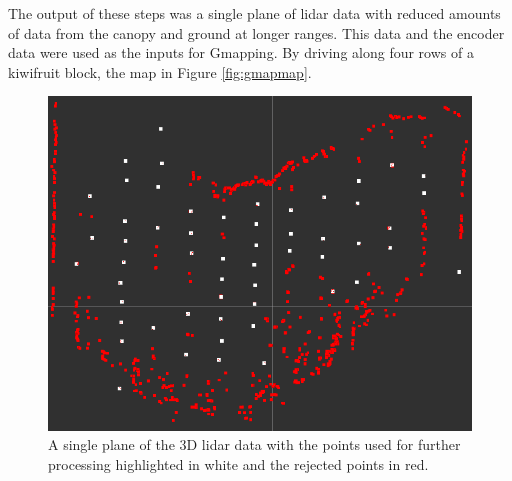 \documentclass[preprint,authoryear,12pt]{elsarticle}
\begin{document}
    The output of these steps was a single plane of lidar data with reduced amounts of data from the canopy and ground at longer ranges. This data and the encoder data were used as the inputs for Gmapping. By driving along four rows of a kiwifruit block, the map in Figure \ref{fig:gmapmap}.

    \begin{figure}[htb]
        \centering
        \includegraphics[width=\linewidth]{imgs/photos/singlePlaneExtraction.png}
        \caption{
            A single plane of the 3D lidar data with the points used for further processing highlighted in white and the rejected points in red.
        }
        \label{fig:singlePlaneExtraction}
    \end{figure}
\end{document}
